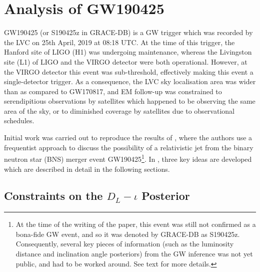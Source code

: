 \section{Analysis of GW190425}\label{sec:190425}

    GW190425 (or S190425z in GRACE-DB) is a GW trigger which was recorded by the LVC on
    25th April, 2019 at 08:18 UTC. At the time of this trigger, the Hanford site of LIGO
    (H1) was undergoing maintenance, whereas the Livingston site (L1) of LIGO and the
    VIRGO detector were both operational. However, at the VIRGO detector this event was
    sub-threshold, effectively making this event a single-detector trigger. As a
    consequence, the LVC sky localisation area was wider than as compared to GW170817,
    and EM follow-up was constrained to serendipitious observations by satellites which
    happened to be observing the same area of the sky, or to diminished coverage by
    satellites due to observational schedules.

    Initial work was carried out to reproduce the results of \cite{saleem_2020}, where
    the authors use a frequentist approach to discuss the possibility of a relativistic
    jet from the binary neutron star (BNS) merger event GW190425\footnote{
        At the time of the writing of the paper, this event was still not confirmed as a
        bona-fide GW event, and so it was denoted by GRACE-DB as S190425z. Consequently,
        several key pieces of information (such as the luminosity distance and
        inclination angle posteriors) from the GW inference was not yet public, and had
        to be worked around. See text for more details.
    }. In \cite{saleem_2020}, three key ideas  are developed which are described in
    detail in the following sections.

    \subsection{Constraints on the \texorpdfstring{$D_L-\iota$}{dL-iota} Posterior}
    \label{sec:dl-iota_posterior}

